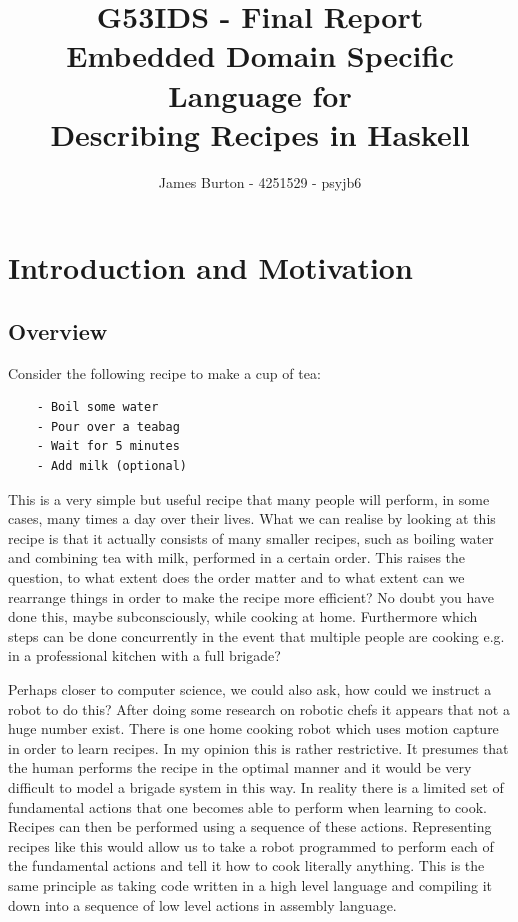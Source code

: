 \documentclass[11pt]{article}
\title
{ 
    \vspace{10em}
    G53IDS - Final Report \\
    \hfill \break
    \large Embedded Domain Specific Language for \\
    Describing Recipes in Haskell
}
\author{James Burton - 4251529 - psyjb6}
\begin{document}
\maketitle
\newpage


\newpage

\tableofcontents
\newpage

\section{Introduction and Motivation}
\subsection{Overview}
Consider the following recipe to make a cup of tea:
\begin{tt}
\small
\begin{lstlisting}
    - Boil some water
    - Pour over a teabag
    - Wait for 5 minutes
    - Add milk (optional)
\end{lstlisting}
\end{tt}

This is a very simple but useful recipe that many people
will perform, in some cases, many times a day over their lives.
What we can realise by looking at this recipe is that it actually
consists of many smaller recipes, such as boiling water and
combining tea with milk, performed in a certain order. This
raises the question, to what extent does the order matter and
to what extent can we rearrange things in order to make the recipe
more efficient? No doubt you have done this, maybe subconsciously,
while cooking at home. Furthermore which steps can be done
concurrently in the event that multiple people are cooking e.g.
in a professional kitchen with a full brigade?

\medbreak

Perhaps closer to computer science, we could also ask, how could
we instruct a robot to do this? After doing some research on
robotic chefs it appears that not a huge number exist.
There is one home cooking robot \cite{robot} which uses motion
capture in order to learn recipes. In my opinion this is rather
restrictive. It presumes that the human performs the recipe in
the optimal manner and it would be very difficult to model
a brigade system in this way. In reality there is a limited set
of fundamental actions that one becomes able to perform when
learning to cook. Recipes can then be performed using a sequence
of these actions. Representing recipes like this would allow us
to take a robot programmed to perform each of the fundamental
actions and tell it how to cook literally anything. This is the
same principle as taking code written in a high level language
and compiling it down into a sequence of low level actions in
assembly language.
\end{document}
